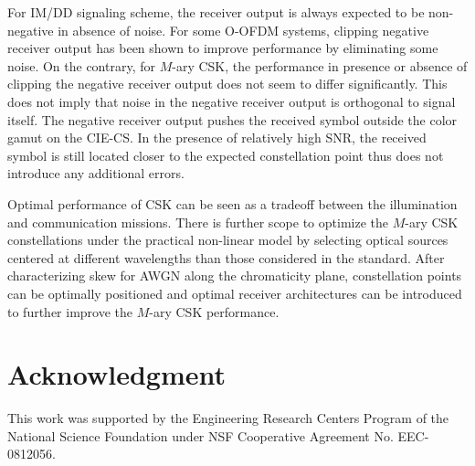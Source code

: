 \documentclass[10pt,letterpaper]{article}
\begin{document}
For IM/DD signaling scheme, the receiver output is always expected to be non-negative in absence of noise. For some O-OFDM systems, clipping negative receiver output has been shown to improve performance by eliminating some noise. On the contrary, for $M$-ary CSK, the performance in presence or absence of clipping the negative receiver output does not seem to differ significantly. This does not imply that noise in the negative receiver output is orthogonal to signal itself. The negative receiver output pushes the received symbol outside the color gamut on the CIE-CS. In the presence of relatively high SNR, the received symbol is still located closer to the expected constellation point thus does not introduce any additional errors.

Optimal performance of CSK can be seen as a tradeoff between the
illumination and communication missions. There is further scope to
optimize the $M$-ary CSK constellations under the practical non-linear
model by selecting optical sources centered at different wavelengths
than those considered in the standard. After characterizing skew for
AWGN along the chromaticity plane, constellation points can be
optimally positioned and optimal receiver architectures can be introduced to further improve the $M$-ary CSK performance.

\section*{Acknowledgment}
This work was supported by the Engineering Research Centers Program of the National Science Foundation under NSF Cooperative Agreement No. EEC-0812056.
\end{document}
